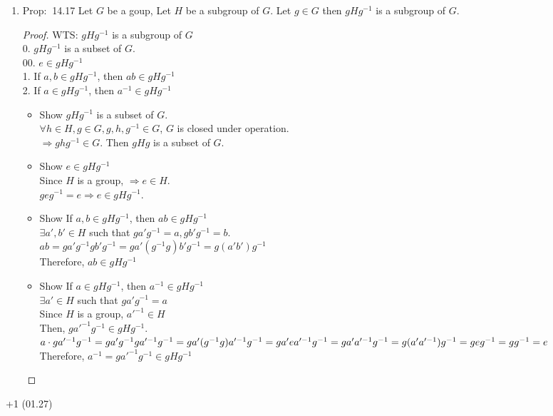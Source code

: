 \documentclass[12pt]{article}
\newcommand{\prop}{{\color{blue} Prop: $\ $}}
\begin{document}
\begin{enumerate}
\begin{enumerate}
        \item \prop 14.17 Let $G$ be a goup, Let $H$ be a subgroup of $G$. Let $g \in G$ then $gHg^{-1}$ is a subgroup of $G$.
        \begin{proof}
            WTS: $gHg^{-1}$ is a subgroup of $G$\\
            0. $gHg^{-1}$ is a subset of $G$.\\
            00. $e \in gHg^{-1}$\\
            1. If $a, b \in gHg^{-1}$, then $ab \in gHg^{-1}$\\
            2. If $a \in gHg^{-1}$, then $a^{-1} \in gHg^{-1}$
            \begin{itemize}
                \item Show $gHg^{-1}$ is a subset of $G$.\\
                $\forall h \in H, g \in G, g, h, g^{-1} \in G$, $G$ is closed under operation.\\
                $\Rightarrow ghg^{-1} \in G$. Then $gHg$ is a subset of $G$.
                \item Show $e \in gHg^{-1}$\\
                Since $H$ is a group, $\Rightarrow e \in H$.\\ $geg^{-1} = e \Rightarrow e \in gHg^{-1}$.
                \item Show If $a, b \in gHg^{-1}$, then $ab \in gHg^{-1}$\\
                $\exists a', b' \in H$ such that $ga'g^{-1} = a, gb'g^{-1} = b$.\\
                $ab = ga'g^{-1}gb'g^{-1} = ga'(g^{-1}g)b'g^{-1} = g(a'b')g^{-1}$\\
                Therefore, $ab \in gHg^{-1}$
                \item Show If $a \in gHg^{-1}$, then $a^{-1} \in gHg^{-1}$\\
                $\exists a' \in H$ such that $ga'g^{-1} = a$\\
                Since $H$ is a group, $a'^{-1} \in H$\\
                Then, $ga'^{-1}g^{-1} \in gHg^{-1}$.\\
                $a\cdot ga'^{-1}g^{-1} \\
                = ga'g^{-1}ga'^{-1}g^{-1} \\
                = ga'(g^{-1}g)a'^{-1}g^{-1} \\
                = ga'ea'^{-1}g^{-1} \\
                = ga'a'^{-1}g^{-1} \\
                = g(a'a'^{-1})g^{-1} \\
                = geg^{-1}  \\
                = gg^{-1} \\
                = e$\\
                Therefore, $a^{-1} = ga'^{-1}g^{-1} \in gHg^{-1}$
            \end{itemize}
            
        \end{proof}
        
    \end{enumerate}
+1 (01.27)
\end{enumerate}
\end{document}
